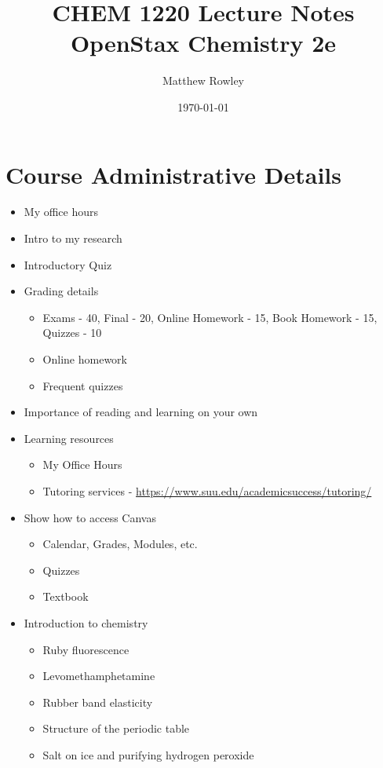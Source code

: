 \documentclass[12pt, openany, letterpaper]{memoir}
\begin{document}
\title{CHEM 1220 Lecture Notes\\ OpenStax Chemistry 2e}
\author{Matthew Rowley}
\date{\today}
\mainmatter
\maketitle
\chapter*{Course Administrative Details}
\begin{itemize}
	\item My office hours
	\item Intro to my research
	\item Introductory Quiz
	\item Grading details
	      \begin{itemize}
		      \item Exams - 40, Final - 20, Online Homework - 15, Book Homework - 15, Quizzes - 10
		      \item Online homework
		      \item Frequent quizzes
	      \end{itemize}
	\item Importance of reading and learning on your own
	\item Learning resources
	      \begin{itemize}
		      \item My Office Hours
		      \item Tutoring services - \href{https://www.suu.edu/academicsuccess/tutoring/}{https://www.suu.edu/academicsuccess/tutoring/}
	      \end{itemize}
	\item Show how to access Canvas
	      \begin{itemize}
		      \item Calendar, Grades, Modules, etc.
		      \item Quizzes
		      \item Textbook
	      \end{itemize}
	\item Introduction to chemistry
	      \begin{itemize}
		      \item Ruby fluorescence
		      \item Levomethamphetamine
		      \item Rubber band elasticity
		      \item Structure of the periodic table
		      \item Salt on ice and purifying hydrogen peroxide
	      \end{itemize}
\end{itemize}
\end{document}
